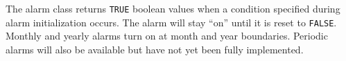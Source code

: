 
The alarm class returns {\tt TRUE} boolean values when a condition 
specified during alarm initialization occurs.  The alarm will
stay ``on'' until it is reset to {\tt FALSE}.  Monthly and yearly 
alarms turn on at month and year boundaries.  Periodic alarms will
also be available but have not yet been fully implemented.






